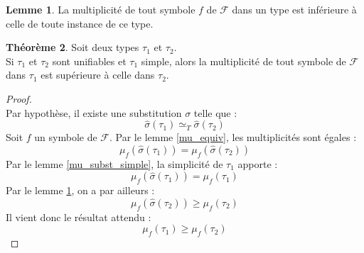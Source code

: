 \documentclass[a4paper]{report}
\newenvironment{preuve} 
	{\begin{proof}~\\} 
	{\end{proof}}
\theoremstyle{definition}
\newtheorem{theoreme}{Théorème}
\newtheorem{lemme}[theoreme]{Lemme}
\newcommand{\F}{\mathscr F}
\newcommand{\Tequiv}{\simeq_T}
\begin{document}
\begin{lemme} \label{mu_subst}
	La multiplicité de tout symbole $f$ de $\F$ dans un type est inférieure à celle de toute instance de ce type.
\end{lemme}

\begin{theoreme}
	Soit deux types $\tau_1$ et $\tau_2$. \\
	Si $\tau_1$ et $\tau_2$ sont unifiables et $\tau_1$ simple, alors la multiplicité de tout symbole de $\F$ dans $\tau_1$ est supérieure à celle dans $\tau_2$.
\end{theoreme}

\begin{preuve}
	Par hypothèse, il existe une substitution $\sigma$ telle que :
	\[ \hat \sigma (\tau_1) \Tequiv \hat \sigma (\tau_2) \]
	Soit $f$ un symbole de $\F$. Par le lemme \ref{mu_equiv}, les multiplicités sont égales :
	\[ \mu_f (\hat \sigma (\tau_1)) = \mu_f (\hat \sigma (\tau_2)) \]
	Par le lemme \ref{mu_subst_simple}, la simplicité de $\tau_1$ apporte :
	\[ \mu_f (\hat \sigma (\tau_1)) = \mu_f (\tau_1) \]
	Par le lemme \ref{mu_subst}, on a par ailleurs :
	\[ \mu_f (\hat \sigma (\tau_2)) \geqslant \mu_f (\tau_2) \]
	Il vient donc le résultat attendu :
	\[ \mu_f (\tau_1) \geqslant \mu_f (\tau_2) \]
\end{preuve}


\printbibliography
\end{document}
